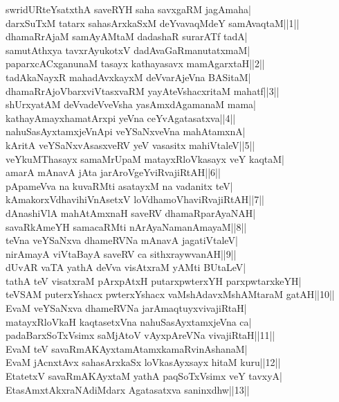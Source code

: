 \documentclass{article}
\begin{document}
swridURteYsatxthA saveRYH saha savxgaRM jagAmaha|\\
darxSuTxM tatarx sahasArxkaSxM deYvavaqMdeY samAvaqtaM||1||\\
dhamaRrAjaM samAyAMtaM dadashaR surarATf tadA|\\
samutAthxya tavxrAyukotxV dadAvaGaRmanutatxmaM|\\
paparxcACxganunaM tasayx kathayasavx mamAgarxtaH||2||\\
tadAkaNayxR mahadAvxkayxM deVvarAjeVna BASitaM|\\
dhamaRrAjoVbarxviVtasxvaRM yayAteVshacxritaM mahatf||3||\\
shUrxyatAM deVvadeVveVsha yasAmxdAgamanaM mama|\\
kathayAmayxhamatArxpi yeVna ceYvAgatasatxva||4||\\
nahuSasAyxtamxjeVnApi veYSaNxveVna mahAtamxnA|\\
kAritA veYSaNxvAsasxveRV yeV vasasitx mahiVtaleV||5||\\
veYkuMThasayx samaMrUpaM matayxRloVkasayx veY kaqtaM|\\
amarA mAnavA jAta jarAroVgeYviRvajiRtAH||6||\\
pApameVva na kuvaRMti asatayxM na vadanitx teV|\\
kAmakorxVdhavihiVnAsetxV loVdhamoVhaviRvajiRtAH||7||\\
dAnashiVlA mahAtAmxnaH saveRV dhamaRparAyaNAH|\\
savaRkAmeYH samacaRMti nArAyaNamanAmayaM||8||\\
teVna veYSaNxva dhameRVNa mAnavA jagatiVtaleV|\\
nirAmayA viVtaBayA saveRV ca sithxraywvanAH||9||\\
dUvAR vaTA yathA deVva visAtxraM yAMti BUtaLeV|\\
tathA teV visatxraM pArxpAtxH putarxpwterxYH parxpwtarxkeYH|\\
teVSAM puterxYshacx pwterxYshacx vaMshAdavxMshAMtaraM gatAH||10||\\
EvaM veYSaNxva dhameRVNa jarAmaqtuyxvivajiRtaH|\\
matayxRloVkaH kaqtasetxVna nahuSasAyxtamxjeVna ca|\\
padaBarxSoTxVsimx saMjAtoV vAyxpAreVNa vivajiRtaH||11||\\
EvaM teV savaRmAKAyxtamAtamxkamaRvinAshanaM|\\
EvaM jAcnxtAvx sahasArxkaSx loVkasAyxsayx hitaM kuru||12||\\
EtatetxV savaRmAKAyxtaM yathA paqSoTxVsimx veY tavxyA|\\
EtasAmxtAkxraNAdiMdarx Agatasatxva saninxdhw||13||\\
\end{document}
